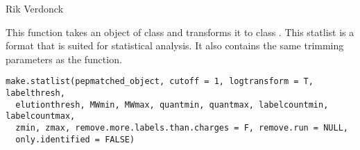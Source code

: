 \documentclass[letterpaper]{book}
\begin{document}
%
\begin{Author}\relax
Rik Verdonck
\end{Author}
%
\begin{Description}\relax
This function takes an object of class  and transforms it to class . This statlist is a format that is suited for statistical analysis. It also contains the same trimming parameters as the  function.
\end{Description}
%
\begin{Usage}
\begin{verbatim}
make.statlist(pepmatched_object, cutoff = 1, logtransform = T, labelthresh,
  elutionthresh, MWmin, MWmax, quantmin, quantmax, labelcountmin, labelcountmax,
  zmin, zmax, remove.more.labels.than.charges = F, remove.run = NULL,
  only.identified = FALSE)
\end{verbatim}
\end{Usage}
%
\end{document}
